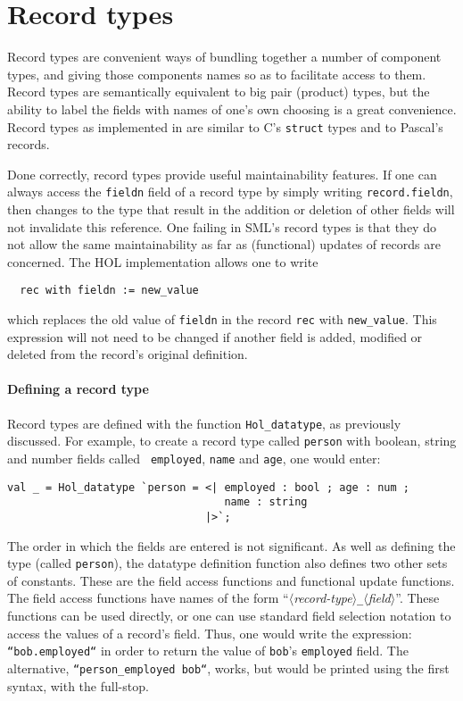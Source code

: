 \section{Record types}

Record types are convenient ways of bundling together a number of
component types, and giving those components names so as to facilitate
access to them.  Record types are semantically equivalent to big pair
(product) types, but the ability to label the fields with names of
one's own choosing is a great convenience.  Record types as
implemented in \HOL{} are similar to C's \texttt{struct} types and to
Pascal's records.

Done correctly, record types provide useful maintainability features.
If one can always access the {\tt fieldn} field of a record type by
simply writing {\tt record.fieldn}, then changes to the type that
result in the addition or deletion of other fields will not invalidate
this reference.  One failing in SML's record types is that they do not
allow the same maintainability as far as (functional) updates of
records are concerned.  The HOL implementation allows one to write
\begin{verbatim}
  rec with fieldn := new_value
\end{verbatim}
which replaces the old value of {\tt fieldn} in the record {\tt rec}
with {\tt new\_value}.  This expression will not need to be changed if
another field is added, modified or deleted from the record's original
definition.

\paragraph{Defining a record type}
Record types are defined with the function \texttt{Hol\_datatype}, as
previously discussed.  For example, to create a record type called
{\tt person} with boolean, string and number fields called {\tt
  employed}, {\tt name} and {\tt age}, one would enter:
\begin{verbatim}
val _ = Hol_datatype `person = <| employed : bool ; age : num ;
                                  name : string
                               |>`;
\end{verbatim}
The order in which the fields are entered is not significant. As well
as defining the type (called {\tt person}), the datatype definition
function also defines two other sets of constants.  These are the
field access functions and functional update functions.  The field
access functions have names of the form
``$\langle$\textsl{record-type\/}$\rangle$\verb|_|$\langle$\textsl{field\/}$\rangle$''.
These functions can be used directly, or one can use standard field
selection notation to access the values of a record's field.  Thus,
one would write the expression: \mbox{\tt ``bob.employed``} in order
to return the value of {\tt bob}'s {\tt employed} field.  The
alternative, \texttt{``person\_employed bob``}, works, but would be
printed using the first syntax, with the full-stop.


